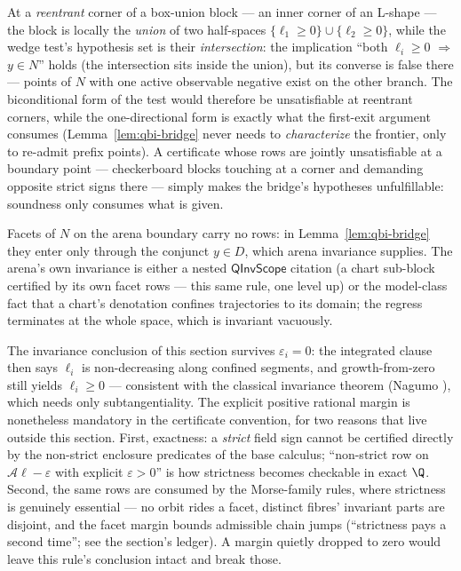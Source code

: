 \begin{bremark}
\label{rem:qbi-wedge}
At a \emph{reentrant} corner of a box-union block --- an inner corner
of an L-shape --- the block is locally the \emph{union} of two
half-spaces $\{\ell_1 \geq 0\} \cup \{\ell_2 \geq 0\}$, while the
wedge test's hypothesis set is their \emph{intersection}: the
implication ``both $\ell_i \geq 0$ $\Rightarrow$ $y \in N$'' holds
(the intersection sits inside the union), but its converse is false
there --- points of $N$ with one active observable negative exist on
the other branch. The biconditional form of the test would therefore
be unsatisfiable at reentrant corners, while the one-directional form
is exactly what the first-exit argument consumes
(Lemma~\ref{lem:qbi-bridge} never needs to \emph{characterize} the
frontier, only to re-admit prefix points). A certificate whose rows
are jointly unsatisfiable at a boundary point --- checkerboard blocks
touching at a corner and demanding opposite strict signs there ---
simply makes the bridge's hypotheses unfulfillable: soundness only
consumes what is given.
\end{bremark}

\begin{bremark}
Facets of $N$ on the arena boundary carry no rows: in
Lemma~\ref{lem:qbi-bridge} they enter only through the conjunct
$y \in D$, which arena invariance supplies. The arena's own invariance
is either a nested $\mathsf{QInvScope}$ citation (a chart sub-block
certified by its own facet rows --- this same rule, one level up) or
the model-class fact that a chart's denotation confines trajectories to
its domain; the regress terminates at the whole space, which is
invariant vacuously.
\end{bremark}

\begin{bremark}\label{rem:qbi-strict}
The invariance conclusion of this section survives
$\varepsilon_i = 0$: the integrated clause then says $\ell_i$ is
non-decreasing along confined segments, and growth-from-zero still
yields $\ell_i \geq 0$ --- consistent with the classical invariance
theorem (Nagumo \cite{nagumo1942}), which needs only subtangentiality.
The explicit positive rational margin is nonetheless mandatory in the
certificate convention, for two reasons that live outside this
section. First, exactness: a \emph{strict} field sign cannot be
certified directly by the non-strict enclosure predicates of the base
calculus; ``non-strict row on $\mathcal{A}\ell - \varepsilon$ with
explicit $\varepsilon > 0$'' is how strictness becomes checkable in
exact $\Q$. Second, the same rows are consumed by the Morse-family
rules, where strictness is genuinely essential --- no orbit rides a
facet, distinct fibres' invariant parts are disjoint, and the facet
margin bounds admissible chain jumps (``strictness pays a second
time''; see the  section's ledger). A margin
quietly dropped to zero would leave this rule's conclusion intact and
break those.
\end{bremark}

